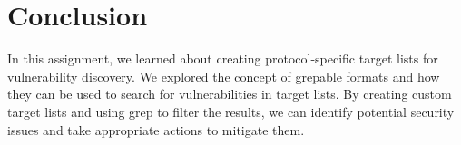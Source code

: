 \documentclass[11pt]{article}
\begin{document}
\section{Conclusion}
In this assignment, we learned about creating protocol-specific target lists for vulnerability discovery. We explored the concept of grepable formats and how they can be used to search for vulnerabilities in target lists. By creating custom target lists and using grep to filter the results, we can identify potential security issues and take appropriate actions to mitigate them.
\clearpage

\pagebreak
\end{document}
